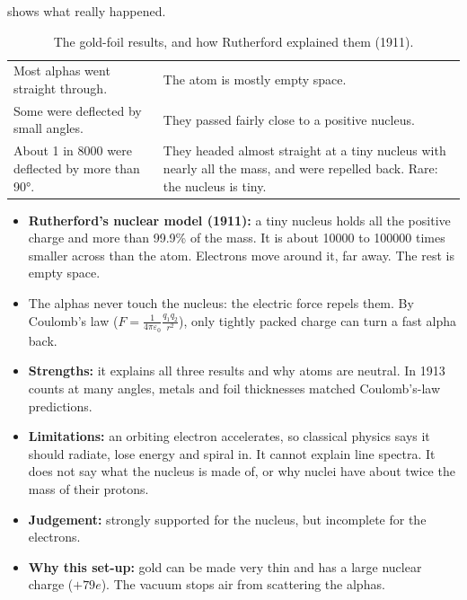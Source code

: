  shows what really happened.

\begin{table}
  \caption{The gold-foil results, and how Rutherford explained them (1911).}\label{ch2:tab:goldfoil}
  \centering\small
  \begin{tabular}{@{}L{50mm}L{94mm}@{}}
    \toprule
     & \\
    \midrule
    Most alphas went straight through. & The atom is mostly empty space.\\
    Some were deflected by small angles. & They passed fairly close to a positive nucleus.\\
    About 1 in 8000 were deflected by more than \ang{90}. & They headed almost straight at a
      tiny nucleus with nearly all the mass, and were repelled back. Rare: the nucleus is tiny.\\
    \bottomrule
  \end{tabular}
\end{table}

\begin{itemize}
  \item \textbf{Rutherford's nuclear model (1911):} a tiny nucleus holds all the positive
        charge and more than 99.9\% of the mass. It is about \num{10000} to \num{100000} times smaller
        across than the atom. Electrons move around it, far away. The rest is empty space.
  \item The alphas never touch the nucleus: the electric force repels them. By Coulomb's law
        ($F = \frac{1}{4\pi\varepsilon_0}\frac{q_1 q_2}{r^2}$), only tightly packed charge can turn
        a fast alpha back.
  \item \textbf{Strengths:} it explains all three results and why atoms are neutral. In 1913
        counts at many angles, metals and foil thicknesses matched Coulomb's-law predictions.
  \item \textbf{Limitations:} an orbiting electron accelerates, so classical physics says it should
        radiate, lose energy and spiral in. It cannot explain line spectra. It does not say what
        the nucleus is made of, or why nuclei have about twice the mass of their protons.
  \item \textbf{Judgement:} strongly supported for the nucleus, but incomplete for the electrons.
  \item \textbf{Why this set-up:} gold can be made very thin and has a large nuclear charge
        ($+79e$). The vacuum stops air from scattering the alphas.
\end{itemize}

